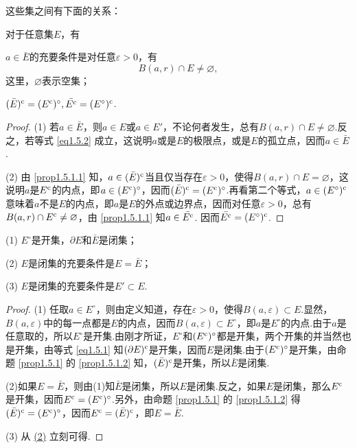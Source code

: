 这些集之间有下面的关系：
\begin{prop}\label{prop1.5.1}
  对于任意集$E$，有
  \begin{eenum}
    \item $a\in\bar E$的充要条件是对任意$\varepsilon>0$，有\label{prop1.5.1.1}
    \begin{equation}\label{eq1.5.2}
       B(a,r)\cap E\ne\varnothing,
    \end{equation}
    这里，$\varnothing$表示空集；
    \item $(\bar E)^{\textrm c}=(E^{\textrm c})^\circ,\bar {E^{\textrm c}}=(E^\circ)^{\textrm c}$.\label{prop1.5.1.2}
  \end{eenum}
\end{prop}
\begin{proof}
(1) 若$a\in\bar E$，则$a\in E$或$a\in E'$，不论何者发生，总有$B(a,r)\cap E\ne\varnothing$.反之，若等式 \eqref{eq1.5.2} 成立，这说明$a$或是$E$的极限点，或是$E$的孤立点，因而$a\in\bar E$.

(2) 由 \ref{prop1.5.1.1} 知，$a\in(\bar E)^{\textrm c}$当且仅当存在$\varepsilon>0$，使得$B(a,r)\cap E=\varnothing$，这说明$a$是$E^{\textrm c}$的内点，即$a\in (E^{\textrm c})^\circ$，因而$(\bar E)^{\textrm c}=(E^{\textrm c})^\circ$.再看第二个等式，$a\in (E^\circ)^{\textrm c}$意味着$a$不是$E$的内点，即$a$是$E$的外点或边界点，因而对任意$\varepsilon>0$，总有$B(a,r)\cap E^{\textrm c}\ne\varnothing$，由 \ref{prop1.5.1.1} 知$a\in \bar{E^{\textrm c}}$. 因而$\bar {E^{\textrm c}}=(E^\circ)^{\textrm c}$.
\end{proof}

\begin{prop}\label{prop1.5.2}
(1) \hypertarget{prop1.5.2.1}{}$E^\circ$是开集，$\partial E$和$\bar E$是闭集；\par
(2) \hypertarget{prop1.5.2.2}{}$E$是闭集的充要条件是$E=\bar E$；\par
(3) \hypertarget{prop1.5.2.3}{}$E$是闭集的充要条件是$E'\subset E$.
\end{prop}
\begin{proof}
(1) 任取$a\in E^\circ$，则由定义知道，存在$\varepsilon>0$，使得$B(a,\varepsilon)\subset E$.显然，$B(a,\varepsilon)$中的每一点都是$E$的内点，因而$B(a,\varepsilon)\subset E^\circ$，即$a$是$E^\circ$的内点.由于$a$是任意取的，所以$E^\circ$是开集.由刚才所证，$E^\circ$和$(E^{\textrm c})^\circ$都是开集，两个开集的并当然也是开集，由等式 \eqref{eq1.5.1} 知$(\partial E)^{\textrm c}$是开集，因而$E$是闭集.由于$(E^{\textrm c})^\circ$是开集，由命题 \ref{prop1.5.1} 的 \ref{prop1.5.1.2}  知，$(\bar E)^{\textrm c}$是开集，所以$\bar E$是闭集.
\par
(2)如果$E=\bar E$，则由(1)知$\bar E$是闭集，所以$E$是闭集.反之，如果$E$是闭集，那么$E^{\textrm c}$是开集，因而$E^{\textrm c}=(E^{\textrm c})^\circ$.另外，由命题 \ref{prop1.5.1} 的 \ref{prop1.5.1.2} 得$(\bar E)^{\textrm c}=(E^{\textrm c})^\circ$，因而$E^{\textrm c}=(\bar E)^{\textrm c}$，即$E=\bar E$.
\par
(3) 从 \hyperlink{prop1.5.2.2}{(2)} 立刻可得.
\end{proof}

